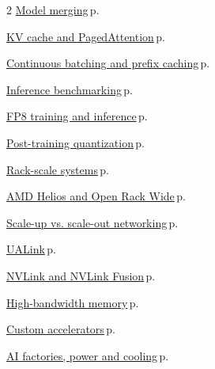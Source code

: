 \documentclass[10pt,a4paper,openany]{report}
\begin{document}
\begin{multicols}{2}
\hyperref[c:training-7]{Model merging}\,{\color{muted}\scriptsize p.\,\pageref{c:training-7}}\par\vspace{1pt}
\hyperref[c:inference-1]{KV cache and PagedAttention}\,{\color{muted}\scriptsize p.\,\pageref{c:inference-1}}\par\vspace{1pt}
\hyperref[c:inference-2]{Continuous batching and prefix caching}\,{\color{muted}\scriptsize p.\,\pageref{c:inference-2}}\par\vspace{1pt}
\hyperref[c:inference-8]{Inference benchmarking}\,{\color{muted}\scriptsize p.\,\pageref{c:inference-8}}\par\vspace{1pt}
\hyperref[c:quant-2]{FP8 training and inference}\,{\color{muted}\scriptsize p.\,\pageref{c:quant-2}}\par\vspace{1pt}
\hyperref[c:quant-3]{Post-training quantization}\,{\color{muted}\scriptsize p.\,\pageref{c:quant-3}}\par\vspace{1pt}
\hyperref[c:hardware-0]{Rack-scale systems}\,{\color{muted}\scriptsize p.\,\pageref{c:hardware-0}}\par\vspace{1pt}
\hyperref[c:hardware-1]{AMD Helios and Open Rack Wide}\,{\color{muted}\scriptsize p.\,\pageref{c:hardware-1}}\par\vspace{1pt}
\hyperref[c:hardware-2]{Scale-up vs. scale-out networking}\,{\color{muted}\scriptsize p.\,\pageref{c:hardware-2}}\par\vspace{1pt}
\hyperref[c:hardware-3]{UALink}\,{\color{muted}\scriptsize p.\,\pageref{c:hardware-3}}\par\vspace{1pt}
\hyperref[c:hardware-6]{NVLink and NVLink Fusion}\,{\color{muted}\scriptsize p.\,\pageref{c:hardware-6}}\par\vspace{1pt}
\hyperref[c:hardware-8]{High-bandwidth memory}\,{\color{muted}\scriptsize p.\,\pageref{c:hardware-8}}\par\vspace{1pt}
\hyperref[c:hardware-11]{Custom accelerators}\,{\color{muted}\scriptsize p.\,\pageref{c:hardware-11}}\par\vspace{1pt}
\hyperref[c:hardware-12]{AI factories, power and cooling}\,{\color{muted}\scriptsize p.\,\pageref{c:hardware-12}}\par\vspace{1pt}

\end{multicols}
\end{document}
